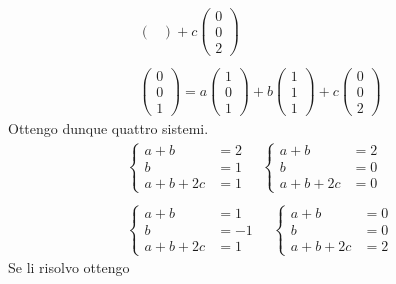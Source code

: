 \begin{example}
\begin{gather*}
\begin{pmatrix}
		\end{pmatrix} +
		c \begin{pmatrix}
			0 \\ 0 \\ 2
		\end{pmatrix}\\
		\\
		\begin{pmatrix}
			0 \\ 0 \\ 1
		\end{pmatrix} =
		a \begin{pmatrix}
			1 \\ 0 \\ 1
		\end{pmatrix} +
		b \begin{pmatrix}
			1 \\ 1 \\ 1
		\end{pmatrix} +
		c \begin{pmatrix}
			0 \\ 0 \\ 2
		\end{pmatrix}
	\end{gather*}
	Ottengo dunque quattro sistemi.
	\begin{gather*}
		\begin{cases}
			a + b      & = 2 \\
			b          & = 1 \\
			a + b + 2c & = 1
		\end{cases}
		\quad
		\begin{cases}
			a + b      & = 2 \\
			b          & = 0 \\
			a + b + 2c & = 0
		\end{cases} \\
		\\
		\begin{cases}
			a + b      & = 1  \\
			b          & = -1 \\
			a + b + 2c & = 1
		\end{cases}
		\quad
		\begin{cases}
			a + b      & = 0 \\
			b          & = 0 \\
			a + b + 2c & = 2
		\end{cases}
	\end{gather*}
	Se li risolvo ottengo
	\begin{gather*}

\end{gather*}
\end{example}
